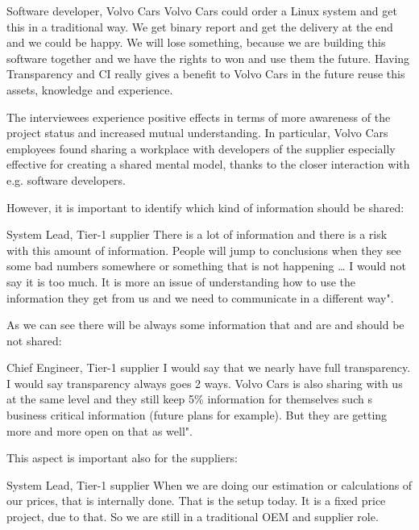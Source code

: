 \begin{aquote}{Software developer, Volvo Cars}
Volvo Cars could order a Linux system and get this in a traditional way. We get binary report and get the delivery at the end and we could be happy. We will lose something, because we are building this software together and we have the rights to won and use them the future. Having Transparency and CI really gives a benefit to Volvo Cars in the future reuse this assets, knowledge and experience.
\end{aquote}


The interviewees experience positive effects in terms of more awareness of the project status and increased mutual understanding. In particular, Volvo Cars employees found sharing a workplace with developers of the supplier especially effective for creating a shared mental model, thanks to the closer interaction with e.g. software developers.

However, it is important to identify which kind of information should be shared:

\begin{aquote}{System Lead, Tier-1 supplier}
There is a lot of information and there is a risk with this amount of information. People will jump to conclusions when they see some bad numbers somewhere or something that is not happening … I would not say it is too much. It is more an issue of understanding how to use the information they get from us and we need to communicate in a different way".
\end{aquote}

As we can see there will be always some information that and are and should be not shared:

\begin{aquote}{Chief Engineer, Tier-1 supplier}
I would say that we nearly have full transparency. I would say transparency always goes 2 ways. Volvo Cars is also sharing with us at the same level and they still keep 5\% information for themselves such s business critical information (future plans for example). But they are getting more and more open on that as well".
\end{aquote}

This aspect is important also for the suppliers:

\begin{aquote}{System Lead, Tier-1 supplier}
When we are doing our estimation or calculations of our prices, that is internally done. That is the setup today. It is a fixed price project, due to that. So we are still in a traditional OEM and supplier role.
\end{aquote}

